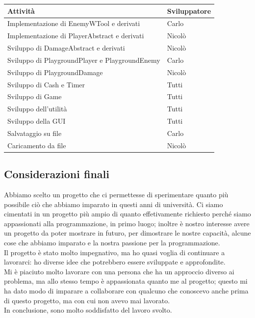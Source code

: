 \documentclass[11pt]{article}
\begin{document}
\begin{table}[ht]
	\centering
	\begin{tabular}{|l|l|}
		\hline
		\textbf{Attività} & \textbf{Sviluppatore} \\
		\hline
		Implementazione di EnemyWTool e derivati & Carlo \\ \hline
		Implementazione di PlayerAbstract e derivati & Nicolò \\ \hline
		Sviluppo di DamageAbstract e derivati & Nicolò \\ \hline
		Sviluppo di PlaygroundPlayer e PlaygroundEnemy & Carlo \\ \hline
		Sviluppo di PlaygroundDamage & Nicolò \\ \hline
		Sviluppo di Cash e Timer & Tutti \\ \hline
		Sviluppo di Game & Tutti \\ \hline
		Sviluppo dell'utilità & Tutti \\ \hline
		Sviluppo della GUI & Tutti \\ \hline
		Salvataggio su file & Carlo \\ \hline
		Caricamento da file & Nicolò \\ \hline
	\end{tabular}
\end{table}

\subsection{Considerazioni finali}

Abbiamo scelto un progetto che ci permettesse di sperimentare quanto più
possibile ciò che abbiamo imparato in questi anni di università. Ci siamo 
cimentati in un progetto più ampio di quanto effetivamente
richiesto perché siamo appassionati alla programmazione, in primo luogo; inoltre
è nostro interesse avere un progetto da poter mostrare in futuro, per
dimostrare le nostre capacità, alcune cose che abbiamo imparato e la nostra
passione per la programmazione. \\
Il progetto è stato molto impegnativo, ma ho quasi voglia di continuare a
lavorarci: ho diverse idee che potrebbero essere sviluppate e approfondite.\\
Mi è piaciuto molto lavorare con una persona che ha un approccio diverso ai
problema, ma allo stesso tempo è appassionata quanto me al progetto; questo
mi ha dato modo di imparare a collaborare con qualcuno che conoscevo anche
prima di questo progetto, ma con cui non avevo mai lavorato. \\
In conclusione, sono molto soddisfatto del lavoro svolto.
\end{document}
